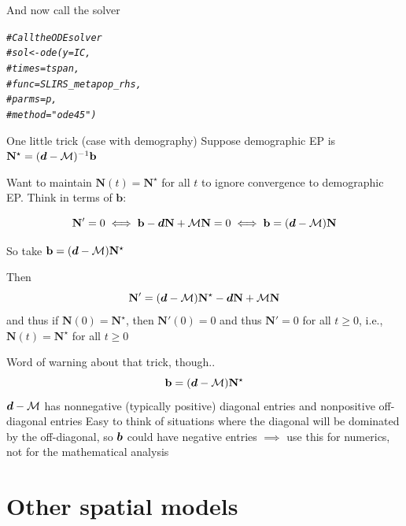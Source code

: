 \documentclass[aspectratio=169]{beamer}\usepackage[]{graphicx}\usepackage[]{xcolor}
\makeatletter
\newcommand{\hlcom}[1]{\textcolor[rgb]{0.678,0.584,0.686}{\textit{#1}}}%
\newenvironment{kframe}{%
 \def\at@end@of@kframe{}%
 \ifinner\ifhmode%
  \def\at@end@of@kframe{\end{minipage}}%
  \begin{minipage}{\columnwidth}%
 \fi\fi%
 \def\FrameCommand##1{\hskip\@totalleftmargin \hskip-\fboxsep
 \colorbox{shadecolor}{##1}\hskip-\fboxsep
     \hskip-\linewidth \hskip-\@totalleftmargin \hskip\columnwidth}%
 \MakeFramed {\advance\hsize-\width
   \@totalleftmargin\z@ \linewidth\hsize
   \@setminipage}}%
 {\par\unskip\endMakeFramed%
 \at@end@of@kframe}
\newenvironment{knitrout}{}{} %
\makeatother
\begin{document}
\begin{frame}[fragile]{And now call the solver}
\begin{knitrout}
\color{fgcolor}\begin{kframe}
\begin{alltt}
\hlcom{# Call the ODE solver}
\hlcom{# sol <- ode(y = IC,}
\hlcom{# 			times = tspan,}
\hlcom{# 			func = SLIRS_metapop_rhs,}
\hlcom{# 			parms = p,}
\hlcom{# 			method = "ode45")}
\end{alltt}
\end{kframe}
\end{knitrout}
\end{frame}
	
\begin{frame}[fragile]{One little trick (case with demography)}
	Suppose demographic EP is $\mathbf{N}^\star=(\bm{d}-\mathcal{M})^{-1}\mathbf{b}$

	Want to maintain $\mathbf{N}(t)=\mathbf{N}^\star$ for all $t$ to ignore convergence to demographic EP. Think in terms of $\mathbf{b}$:
	
	$$
	\mathbf{N}'=0\iff \mathbf{b}-\bm{d}\mathbf{N}+\mathcal{M}\mathbf{N}=0 \iff \mathbf{b} = (\bm{d}-\mathcal{M})\mathbf{N}
	$$
	
	So take $\mathbf{b}=(\bm{d}-\mathcal{M})\mathbf{N}^\star$
	
	Then
	$$
	\mathbf{N}' = (\bm{d}-\mathcal{M})\mathbf{N}^\star
	-\bm{d}\mathbf{N}+\mathcal{M}\mathbf{N}
	$$
	and thus if $\mathbf{N}(0)=\mathbf{N}^\star$, then $\mathbf{N}'(0)=0$ and thus $\mathbf{N}'=0$ for all $t\geq 0$, i.e., $\mathbf{N}(t)=\mathbf{N}^\star$ for all $t\geq 0$
\end{frame}

\begin{frame}{Word of warning about that trick, though..}
$$
\mathbf{b}=(\bm{d}-\mathcal{M})\mathbf{N}^\star
$$
\vfill
$\bm{d}-\mathcal{M}$ has nonnegative (typically positive) diagonal entries and nonpositive off-diagonal entries
\vfill
Easy to think of situations where the diagonal will be dominated by the off-diagonal, so $\bm{b}$ could have negative entries
\vfill
$\implies$ use this for numerics, not for the mathematical analysis
\end{frame}


\section{Other spatial models}
\end{document}

